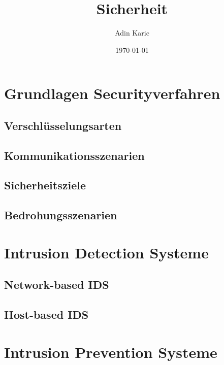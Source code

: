 \documentclass[11pt]{scrartcl}
\title{Sicherheit}
\author{Adin Karic}
\date{\today{}}
\begin{document}
\maketitle
\tableofcontents
\pagebreak

\section{Grundlagen Securityverfahren}
\label{sec:basics-security-process}

\subsection{Verschlüsselungsarten}
\label{sec:ciphering types}

\subsection{Kommunikationsszenarien}
\label{sec:communication-scenarios}

\subsection{Sicherheitsziele}
\label{sec:security goals}

\subsection{Bedrohungsszenarien}
\label{sec:threat scenarios}

\section{Intrusion Detection Systeme}
\label{sec:IDS}

\subsection{Network-based IDS}
\label{sec:nw-based IDS}

\subsection{Host-based IDS}
\label{sec:host based IDS}

\section{Intrusion Prevention Systeme}
\label{sec:intrusion prevention systems}
\end{document}
